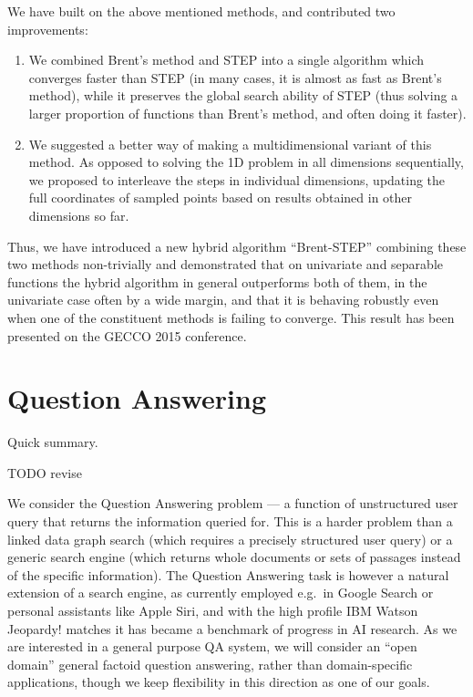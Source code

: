 We have built on the above mentioned methods, and contributed two improvements:

\begin{enumerate}
	\item We combined Brent's method and STEP into a single algorithm which converges faster than STEP (in many cases, it is almost as fast as Brent's method), while it preserves the global search ability of STEP (thus solving a larger proportion of functions than Brent's method, and often doing it faster).

	\item We suggested a better way of making a multidimensional variant of this method. As opposed to solving the 1D problem in all dimensions sequentially, we proposed to interleave the steps in individual dimensions, updating the full coordinates of sampled points based on results obtained in other dimensions so far.
\end{enumerate}

Thus, we have introduced a new hybrid algorithm ``Brent-STEP'' combining
these two methods non-trivially and demonstrated that
on univariate and separable functions the hybrid algorithm
in general outperforms both of them,
in the univariate case often by a wide margin,
and that it is behaving robustly even when one of the constituent methods
is failing to converge.
This result has been presented on the GECCO 2015 conference.
\cite{ndsqistep}

\section{Question Answering}

Quick summary.

TODO revise

We consider the Question Answering problem --- a function of
unstructured user query that returns the information queried for.
This is a harder problem than a linked data graph search (which requires
a precisely structured user query) or a generic search engine (which
returns whole documents or sets of passages instead of the specific
information).
The Question Answering task is however a natural extension of a search
engine, as currently employed e.g.\ in Google Search \cite{googleKG}
or personal assistants like Apple Siri, and with the high
profile IBM Watson Jeopardy! matches \cite{WatsonOverview}
it has became a benchmark of progress in AI research.
As we are interested in a general purpose QA system, we will consider
an ``open domain'' general factoid question answering, rather than
domain-specific applications, though we keep flexibility in this direction
as one of our goals.

